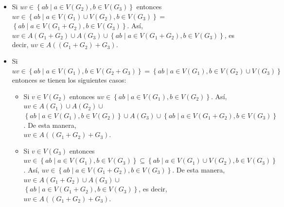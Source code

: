 \documentclass[fleqn]{article}
\begin{document}
\begin{enumerate}[a)]
\begin{itemize}
            \item Si $ uv \in \left\lbrace ab \mid a \in V \left( G_2 \right), b \in V \left( G_3 \right) \right\rbrace $ entonces $ uv \in \left\lbrace ab \mid a \in V \left( G_1 \right) \cup V \left( G_2 \right), b \in V \left( G_3 \right) \right\rbrace = $ \\ $ \left\lbrace ab \mid a \in V \left( G_1 + G_2 \right), b \in V \left( G_3 \right) \right\rbrace $. Así, $ uv \in A \left( G_1 + G_2 \right) \cup A \left( G_3 \right) \cup \left\lbrace ab \mid a \in V \left( G_1 + G_2 \right), b \in V \left( G_3 \right) \right\rbrace $, es decir, $ uv \in A \left( \left( G_1 + G_2 \right) + G_3 \right) $.
            
            \item Si $ uv \in \left\lbrace ab \mid a \in V \left( G_1 \right), b \in V \left( G_2 + G_3 \right) \right\rbrace = \left\lbrace ab \mid a \in V \left( G_1 \right), b \in V \left( G_2 \right) \cup V \left( G_3 \right) \right\rbrace $ entonces se tienen los siguientes casos:
            
            \begin{itemize}
                \item Si $ v \in V \left( G_2 \right) $ entonces $ uv \in \left\lbrace ab \mid a \in V \left( G_1 \right), b \in V \left( G_2 \right) \right\rbrace $. Así, $ uv \in A \left( G_1 \right) \cup A \left( G_2 \right) \cup $ \\ $ \left\lbrace ab \mid a \in V \left( G_1 \right), b \in V \left( G_2 \right) \right\rbrace \cup A \left( G_3 \right) \cup \left\lbrace ab \mid a \in V \left( G_1 + G_2 \right), b \in V \left( G_3 \right) \right\rbrace $. De esta manera, \\ $ uv \in A \left( \left( G_1 + G_2 \right) + G_3 \right) $.
                
                \item Si $ v \in V \left( G_3 \right) $ entonces $ uv \in \left\lbrace ab \mid a \in V \left( G_1 \right), b \in V \left( G_3 \right) \right\rbrace \subseteq \left\lbrace ab \mid a \in V \left( G_1 \right) \cup V \left( G_2 \right), b \in V \left( G_3 \right) \right\rbrace $. Así, $ uv \in \left\lbrace ab \mid a \in V \left( G_1 + G_2 \right), b \in V \left( G_3 \right) \right\rbrace $. De esta manera, $ uv \in A \left( G_1 + G_2 \right) \cup A \left( G_3 \right) \cup $ \\ $ \left\lbrace ab \mid a \in V \left( G_1 + G_2 \right), b \in V \left( G_3 \right) \right\rbrace $, es decir, $ uv \in A \left( \left( G_1 + G_2 \right) + G_3 \right) $.
            \end{itemize}
        \end{itemize}


\end{enumerate}
\end{document}
